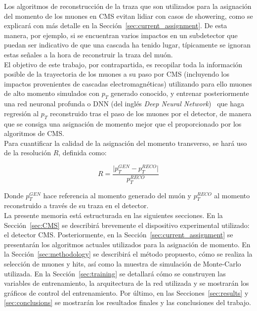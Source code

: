 Los algoritmos de reconstrucci\'on de la traza que son utilizados para la asignaci\'on del momento de los muones en CMS evitan lidiar con casos de showering, como se explicar\'a con m\'as detalle en la Secci\'on~\ref{sec:current_assignment}. De esta manera, por ejemplo, si se encuentran varios impactos en un subdetector que puedan ser indicativo de que una cascada ha tenido lugar, t\'ipicamente se ignoran estas se\~nales a la hora de reconstruir la traza del mu\'on. \\
El objetivo de este trabajo, por contrapartida, es recopilar toda la informaci\'on posible de la trayectoria de los muones a su paso por CMS (incluyendo los impactos provenientes de cascadas electromagn\'eticas) utilizando para ello muones de alto momento simulados con $p_{T}$ generado conocido, y entrenar posteriormente una red neuronal profunda o DNN (del ingl\'es \textit{Deep Neural Network})~\cite{Schmidhuber:2015} que haga regresi\'on al $p_{T}$ reconstruido tras el paso de los muones por el detector, de manera que se consiga una asignaci\'on de momento mejor que el proporcionado por los algoritmos de CMS. \\

Para cuantificar la calidad de la asignaci\'on del momento transverso, se har\'a uso de la resoluci\'on $R$, definida como:

\begin{equation}
  R = \dfrac{\lvert p_{T}^{GEN} - p_{T}^{RECO}\rvert}{p_{T}^{RECO}}
\label{eq:R}
\end{equation}

Donde $p_{T}^{GEN}$ hace referencia al momento generado del mu\'on y $p_{T}^{RECO}$ al momento reconstruido a trav\'es de su traza en el detector. \\

La presente memoria est\'a estructurada en las siguientes secciones. En la Secci\'on~\ref{sec:CMS} se describir\'a brevemente el dispositivo experimental utilizado: el detector CMS. Posteriormente, en la Secci\'on~\ref{sec:current_assignment} se presentar\'an los algoritmos actuales utilizados para la asignaci\'on de momento. En la Secci\'on~\ref{sec:methodology} se describir\'a el m\'etodo propuesto, c\'omo se realiza la selecci\'on de muones y hits, as\'i como la muestra de simulaci\'on de Monte-Carlo utilizada. En la Secci\'on~\ref{sec:training} se detallar\'a c\'omo se construyen las variables de entrenamiento, la arquitectura de la red utilizada y se mostrar\'an los gr\'aficos de control del entrenamiento. Por \'ultimo, en las Secciones~\ref{sec:results} y \ref{sec:conclusions} se mostrar\'an los resultados finales y las conclusiones del trabajo.
